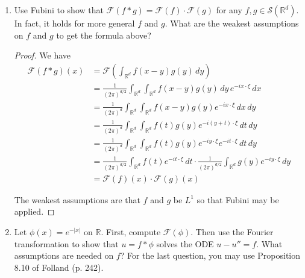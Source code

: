 \documentclass[11pt,oneside,english]{amsart}
\theoremstyle{definition}
\newcommand{\MC}[1]{\mathcal{#1}}
\newcommand{\MB}[1]{\mathbb{#1}}
\begin{document}
\begin{enumerate}
\item Use Fubini to show that $\MC{F}(f*g)=\MC{F}(f)\cdot\MC{F}(g)$ for any $f,g\in \MC{S}(\MB{R}^d)$. In fact, it holds for more general $f$ and $g$. What are the weakest assumptions on $f$ and $g$ to get the formula above?

\begin{proof}
We have
\begin{align*}
\MC{F}(f*g)(x)&=\MC{F}\left(\int_{\MB{R}^d}f(x-y)g(y)\,dy\right)\\[2mm]
&=\frac{1}{(2\pi)^{d/2}}\int_{\MB{R}^d}\int_{\MB{R}^d}f(x-y)g(y)\,dy\,e^{-ix\cdot\xi}\,dx\\[2mm]
&=\frac{1}{(2\pi)^{d}}\int_{\MB{R}^d}\int_{\MB{R}^d}f(x-y)g(y)e^{-ix\cdot\xi}\,dx\,dy\\[2mm]
&=\frac{1}{(2\pi)^{d}}\int_{\MB{R}^d}\int_{\MB{R}^d}f(t)g(y)e^{-i(y+t)\cdot\xi}\,dt\,dy\\[2mm]
&=\frac{1}{(2\pi)^{d}}\int_{\MB{R}^d}\int_{\MB{R}^d}f(t)g(y)e^{-iy\cdot\xi}e^{-it\cdot\xi}\,dt\,dy\\[2mm]
&=\frac{1}{(2\pi)^{d/2}}\int_{\MB{R}^d}f(t)e^{-it\cdot\xi}\,dt\cdot\frac{1}{(2\pi)^{d/2}}\int_{\MB{R}^d}g(y)e^{-iy\cdot\xi}\,dy\\[2mm]
&=\MC{F}(f)(x)\cdot\MC{F}(g)(x)
\end{align*}

The weakest assumptions are that $f$ and $g$ be $L^1$ so that Fubini may be applied.
\end{proof}

\item Let $\phi(x)=e^{-|x|}$ on $\MB{R}$. First, compute $\MC{F}(\phi)$. Then use the Fourier transformation to show that $u=f*\phi$ solves the ODE $u-u''=f$. What assumptions are needed on $f$? For the last question, you may use Proposition 8.10 of Folland (p. 242).


\end{enumerate}
\end{document}

